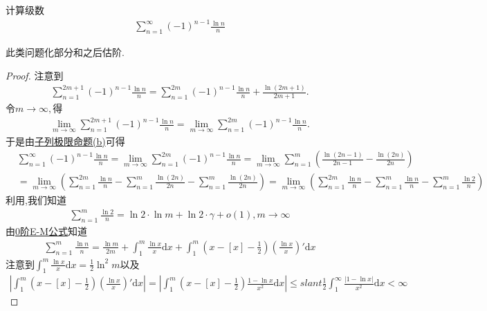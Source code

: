 \documentclass[../../main.tex]{subfiles}
\begin{document}
\begin{example}
计算级数
\begin{align*}
\sum_{n=1}^{\infty} (-1)^{n - 1} \frac{\ln n}{n}
\end{align*}
\end{example}
\begin{note}
此类问题化部分和之后估阶.
\end{note}
\begin{proof}
注意到
\begin{align*}
\sum_{n=1}^{2m+1}{\left( -1 \right) ^{n-1}\frac{\ln n}{n}}=\sum_{n=1}^{2m}{\left( -1 \right) ^{n-1}\frac{\ln n}{n}}+\frac{\ln \left( 2m+1 \right)}{2m+1}.
\end{align*}
令$m\rightarrow \infty ,$得
\begin{align*}
\underset{m\rightarrow \infty}{\lim}\sum_{n=1}^{2m+1}{\left( -1 \right) ^{n-1}\frac{\ln n}{n}}=\underset{m\rightarrow \infty}{\lim}\sum_{n=1}^{2m}{\left( -1 \right) ^{n-1}\frac{\ln n}{n}}.
\end{align*}
于是由\hyperref[proposition:子列极限命题]{子列极限命题(b)}可得
\begin{align*}
&\sum_{n=1}^{\infty} (-1)^{n - 1} \frac{\ln n}{n} = \lim_{m \to \infty} \sum_{n=1}^{2m} (-1)^{n - 1} \frac{\ln n}{n} = \lim_{m \to \infty} \sum_{n=1}^{m} \left( \frac{\ln(2n - 1)}{2n - 1} - \frac{\ln(2n)}{2n} \right) \\
&= \lim_{m \to \infty} \left( \sum_{n=1}^{2m} \frac{\ln n}{n} - \sum_{n=1}^{m} \frac{\ln(2n)}{2n} - \sum_{n=1}^{m} \frac{\ln(2n)}{2n} \right) = \lim_{m \to \infty} \left( \sum_{n=1}^{2m} \frac{\ln n}{n} - \sum_{n=1}^{m} \frac{\ln n}{n} - \sum_{n=1}^{m} \frac{\ln 2}{n} \right)
\end{align*}
利用,我们知道
\begin{align*}
\sum_{n=1}^{m} \frac{\ln 2}{n} = \ln 2 \cdot \ln m + \ln 2 \cdot \gamma + o(1), m \to \infty
\end{align*}
由\hyperref[proposition:0阶欧拉麦克劳林公式(0阶E-M公式)]{0阶E-M公式}知道
\begin{align*}
\sum_{n=1}^{m} \frac{\ln n}{n} = \frac{\ln m}{2m} + \int_{1}^{m} \frac{\ln x}{x} \mathrm{d}x + \int_{1}^{m} \left( x - [x] - \frac{1}{2} \right) \left( \frac{\ln x}{x} \right)' \mathrm{d}x
\end{align*}
注意到$\int_{1}^{m} \frac{\ln x}{x} \mathrm{d}x = \frac{1}{2} \ln^2 m$以及
\begin{align*}
\left| \int_{1}^{m} \left( x - [x] - \frac{1}{2} \right) \left( \frac{\ln x}{x} \right)' \mathrm{d}x \right| = \left| \int_{1}^{m} \left( x - [x] - \frac{1}{2} \right) \frac{1 - \ln x}{x^2} \mathrm{d}x \right| \leqslant slant \frac{1}{2} \int_{1}^{\infty} \frac{|1 - \ln x|}{x^2} \mathrm{d}x < \infty

\end{align*}
\end{proof}
\end{document}
